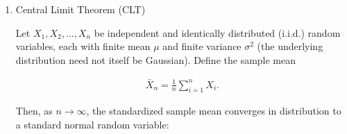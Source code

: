 \begin{enumerate}[label=\thesubsection.\arabic*,ref=\thesubsection.\theenumi]
The function is symmetric about $x=\mu$, and satisfies

\begin{align}
\int_{-\infty}^{\infty}f(x)\,dx=1,
\qquad
E[X]=\mu,
\qquad
\operatorname{Var}(X)=\sigma^{2}.
\end{align}


\begin{enumerate}

    \item Binomial Approximation (De Moivre--Laplace Theorem)
    For a binomial random variable $X \sim \text{Bin}(n, p)$ with large $n$ such that $np \ge 5$ and $n(1-p) \ge 5$, the binomial distribution can be approximated by a Gaussian distribution with:
    \begin{align}
    \mu = np, \quad \sigma^2 = np(1-p).
    \end{align}
    
    The probability mass function is approximated as:
    \begin{align}
    \pr{X = k} \approx \frac{1}{\sqrt{2\pi np(1-p)}} \exp\left( -\frac{(k - np)^2}{2np(1-p)} \right).
    \end{align}

    \item Continuity Correction
    When approximating a discrete binomial distribution using a continuous Gaussian distribution, a continuity correction factor of $0.5$ is applied:
    \begin{align}
    \pr{a \le X \le b} \approx P\left( \frac{a - 0.5 - np}{\sqrt{np(1-p)}} \le Z \le \frac{b + 0.5 - np}{\sqrt{np(1-p)}} \right).
    \end{align}

\end{enumerate}

\item Central Limit Theorem (CLT)

Let $X_1,X_2,\dots,X_n$ be independent and identically distributed
(i.i.d.) random variables, each with finite mean $\mu$ and finite
variance $\sigma^{2}$ (the underlying distribution need not itself be
Gaussian). Define the sample mean

\begin{align}
\bar{X}_n=\frac{1}{n}\sum_{i=1}^{n}X_i.
\end{align}

Then, as $n\to\infty$, the standardized sample mean converges in
distribution to a standard normal random variable:


\end{enumerate}
